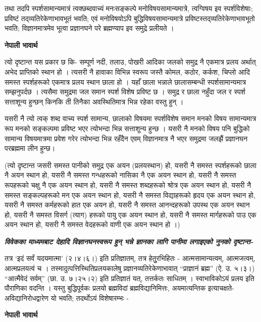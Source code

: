 \documentclass[11pt, a5paper]{article}
\begin{document}
तथा तदपि स्पर्शसामान्यमात्रं त्वक्छब्दवाच्यं मनःसङ्‍कल्पे मनोविषयसामान्यमात्रे, त्वग्विषय इव स्पर्शविशेषाः; प्रविष्टं तद्‍व्यतिरेकेणाभावभूतं भवति; एवं मनोविषयोऽपि बुद्धिविषयसामान्यमात्रे प्रविष्टस्तद्‍व्यतिरेकेणाभावभूतो भवति; विज्ञानमात्रमेव भूत्वा प्रज्ञानघने परे ब्रह्मण्याप इव समुद्रे प्रलीयते ।

\textbf{नेपाली भावार्थ}

त्यो दृष्टान्त यस प्रकार छ कि- सम्पूर्ण नदी, तलाउ, पोखरी आदिका जलको समुद्र नै एकमात्र प्रलय अर्थात् अभेद प्राप्तिको स्थान हो ।  त्यसरी नै हावाका विभिन्न स्वरूप जस्तै कोमल, कठोर, कर्कश, चिप्लो आदि समस्त स्पर्शहरूको एकमात्र प्रलय स्थान छाला हो । यहाँ छाला भन्नाले छालासम्बन्धी स्पर्शसामान्यमात्र सम्झनुपर्दछ । त्यसैमा समुद्रमा जल समान स्पर्श विशेष प्रविष्ट छ । समुद्र र छाला नहुँदा जल र स्पर्श सत्ताशून्य हुन्छन् किनकि ती तिनैका अवस्थितिमात्र भिन्न रहेका वस्तु हुन् ।

यसरी नै त्यो त्वक् शब्द वाच्य स्पर्श सामान्य, छालाको विषयमा स्पर्शविशेष समान मनको विषय सामान्यमात्र रूप मनको सङ्कल्पमा प्रविष्ट भएर त्योभन्दा भिन्न सत्ताशून्य हुन्छ । यसरी नै मनको विषय पनि बुद्धिको सामान्य विषयमात्रमा प्रवेश गरेर त्योभन्दा भिन्न रहँदैन एवम् विज्ञानमात्र नै भएर समुद्रमा जलझैं प्रज्ञानघन परब्रह्ममा लीन हुन्छ।

(त्यो दृष्टान्त जसरी समस्त पानीको समुद्र एक अयन (प्रलयस्थान) हो, यसरी नै समस्त स्पर्शहरूको छाला नै अयन स्थान हो, यसरी नै समस्त गन्धहरूको नासिका नै एक अयन स्थान हो, यसरी नै समस्त रूपहरूको चक्षु नै एक अयन स्थान हो, यसरी नै समस्त शब्दहरूको श्रोत्र एक अयन स्थान हो, यसरी नै समस्त सङ्कल्पहरूको मन एक अयन स्थान हो, यसरी नै समस्त विद्याहरूको हृदय एक अयन स्थान हो, यसरी नै समस्त कर्महरूको हात एक अयन हो, यसरी नै समस्त आनन्दहरूको उपस्थ एक अयन स्थान हो, यसरी नै समस्त विसर्ग (त्याग) हरूको पायु एक अयन स्थान हो, यसरी नै समस्त मार्गहरूको पाउ एक अयन स्थान हो, यसरी नै समस्त वेदहरूको वाणी एक अयन स्थान हो ।)

\textit{\textbf{विवेकका माध्यमबाट देहादि विज्ञानघनस्वरूप हुन् भन्ने ज्ञानका लागि पानीमा लगाइएको नुनको दृष्टान्त-}}

तत्र ‘इदं सर्वं यदयमात्मा’ (२।४।६।) इति प्रतिज्ञातम्, तत्र हेतुुरभिहितः - आत्मसामान्यत्वम्, आत्मजत्वम्, आत्मप्रलयत्वं च । तस्मादुत्पत्तिस्थितिप्रलयकालेषु प्रज्ञानव्यतिरेकेणाभावात् “प्राज्ञानं ब्रह्म” (ऐ. उ. ५।३।) “आत्मैवेदं सर्वम्” (छा. उ. ७।२५।२) इति प्रतिज्ञातं यत्, तत्तर्कतः साधितम् । स्वाभाविकोऽयं प्रलय इति पौराणिका वदन्ति । यस्तु बुद्धिपूर्वकः प्रलयो ब्रह्मविदां ब्रह्मविद्यानिमित्तः, अयमात्यन्तिक इत्याचक्षते- अविद्यानिरोधद्वारेण यो भवति; तदर्थोऽयं विशेषारम्भः -

\textbf{नेपाली भावार्थ}
\end{document}
